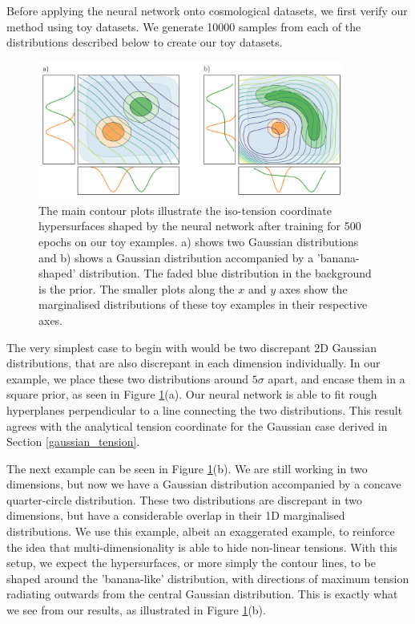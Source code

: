 \documentclass[%
 reprint,
 amsmath,amssymb,
 aps,
]{revtex4-2}
\begin{document}
Before applying the neural network onto cosmological datasets, we first verify our method using toy datasets. We generate 10000 samples from each of the distributions described below to create our toy datasets.

\begin{figure}
    \includegraphics[width=0.9\textwidth]{../plots/toy_wide.png}
    \centering
    \caption{The main contour plots illustrate the iso-tension coordinate hypersurfaces shaped by the neural network after training for 500 epochs on our toy examples. a) shows two Gaussian distributions and b) shows a Gaussian distribution accompanied by a 'banana-shaped' distribution. The faded blue distribution in the background is the prior. The smaller plots along the $x$ and $y$ axes show the marginalised distributions of these toy examples in their respective axes.}
    \label{fig:toy}
\end{figure}

The very simplest case to begin with would be two discrepant 2D Gaussian distributions, that are also discrepant in each dimension individually. In our example, we place these two distributions around $5\sigma$ apart, and encase them in a square prior, as seen in Figure \ref{fig:toy}(a).  Our neural network is able to fit rough hyperplanes perpendicular to a line connecting the two distributions. This result agrees with the analytical tension coordinate for the Gaussian case derived in Section \ref{gaussian_tension}.

The next example can be seen in Figure \ref{fig:toy}(b). We are still working in two dimensions, but now we have a Gaussian distribution accompanied by a concave quarter-circle distribution. These two distributions are discrepant in two dimensions, but have a considerable overlap in their 1D marginalised distributions. We use this example, albeit an exaggerated example, to reinforce the idea that multi-dimensionality is able to hide non-linear tensions. With this setup, we expect the hypersurfaces, or more simply the contour lines, to be shaped around the 'banana-like' distribution, with directions of maximum tension radiating outwards from the central Gaussian distribution. This is exactly what we see from our results, as illustrated in Figure \ref{fig:toy}(b).
\end{document}
